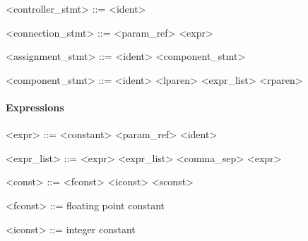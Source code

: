 \vs

\begin{grammar}
  <controller_stmt> ::=  \tn{$($} <ident> \tn{$)$}
\end{grammar}

\vs

\begin{grammar}
  <connection_stmt> ::= <param_ref> \tn{\textless-} <expr>
\end{grammar}

\vs

\begin{grammar}
  <assignment_stmt> ::= <ident> \tn{=} <component_stmt>
\end{grammar}

\vs

\begin{grammar}
  <component_stmt> ::= <ident> <lparen> <expr_list> <rparen>
\end{grammar}


\paragraph{Expressions}

\begin{grammar}
  <expr> ::= <constant>
  \alt <param_ref>
  \alt <ident>
\end{grammar}

\vs

\begin{grammar}
  <expr_list> ::= <expr>
  \alt <expr_list> <comma_sep> <expr>
\end{grammar}

\vs

\begin{grammar}
  <const> ::= <fconst>
  \alt <iconst>
  \alt <sconst>
\end{grammar}

\vs

\begin{grammar}
  <fconst> ::= floating point constant
\end{grammar}

\vs

\begin{grammar}
  <iconst> ::= integer constant
\end{grammar}

\vs

